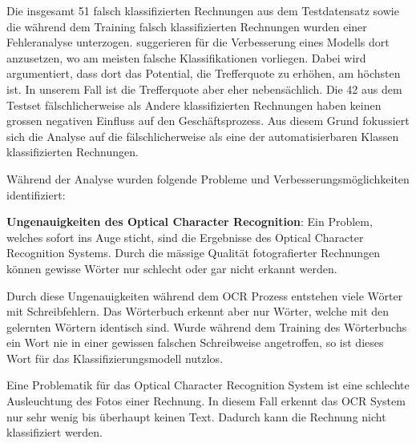 

Die insgesamt 51 falsch klassifizierten Rechnungen aus dem Testdatensatz sowie die während dem Training falsch klassifizierten Rechnungen wurden einer Fehleranalyse unterzogen. \textcite{MLYearning} suggerieren für die Verbesserung eines Modells dort anzusetzen, wo am meisten falsche Klassifikationen vorliegen. Dabei wird argumentiert, dass dort das Potential, die Trefferquote zu erhöhen, am höchsten ist. In unserem Fall ist die Trefferquote aber eher nebensächlich. Die 42 aus dem Testset fälschlicherweise als Andere klassifizierten Rechnungen haben keinen grossen negativen Einfluss auf den Geschäftsprozess. Aus diesem Grund fokussiert sich die Analyse auf die fälschlicherweise als eine der automatisierbaren Klassen klassifizierten Rechnungen. 

Während der Analyse wurden folgende Probleme und Verbesserungsmöglichkeiten identifiziert:



\nopagebreak
\label{chap:ocr-quality}
\textbf{Ungenauigkeiten des Optical Character Recognition}: Ein Problem, welches sofort ins Auge sticht, sind die Ergebnisse des Optical Character Recognition Systems. Durch die mässige Qualität fotografierter Rechnungen können gewisse Wörter nur schlecht oder gar nicht erkannt werden. 

Durch diese Ungenauigkeiten während dem OCR Prozess entstehen viele Wörter mit Schreibfehlern. Das Wörterbuch erkennt aber nur Wörter, welche mit den gelernten Wörtern identisch sind. Wurde während dem Training des Wörterbuchs ein Wort nie in einer gewissen falschen Schreibweise angetroffen, so ist dieses Wort für das Klassifizierungsmodell nutzlos.

Eine Problematik für das Optical Character Recognition System ist eine schlechte Ausleuchtung des Fotos einer Rechnung. In diesem Fall erkennt das OCR System nur sehr wenig bis überhaupt keinen Text. Dadurch kann die Rechnung nicht klassifiziert werden.

